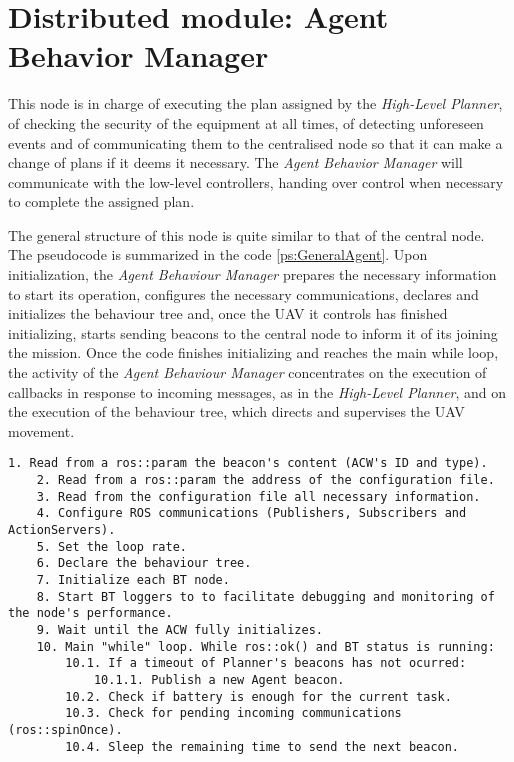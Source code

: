 \section{Distributed module: Agent Behavior Manager}
\label{sec:Distributed module: behavior manager}
This node is in charge of executing the plan assigned by the \emph{High-Level Planner}, of checking the security of the equipment at all times, of detecting unforeseen events and of communicating them to the centralised node so that it can make a change of plans if it deems it necessary. The \emph{Agent Behavior Manager} will communicate with the low-level controllers, handing over control when necessary to complete the assigned plan.

The general structure of this node is quite similar to that of the central node. The pseudocode is summarized in the code \ref{ps:GeneralAgent}. Upon initialization, the \emph{Agent Behaviour Manager} prepares the necessary information to start its operation, configures the necessary communications, declares and initializes the behaviour tree and, once the \gls{UAV} it controls has finished initializing, starts sending beacons to the central node to inform it of its joining the mission. Once the code finishes initializing and reaches the main while loop, the activity of the \emph{Agent Behaviour Manager} concentrates on the execution of callbacks in response to incoming messages, as in the \emph{High-Level Planner}, and on the execution of the behaviour tree, which directs and supervises the \gls{UAV} movement.

\begin{lstlisting}[caption={General operation of \emph{Agent Behaviour Manager}'s code}, breaklines=true, label=ps:GeneralAgent]
	1. Read from a ros::param the beacon's content (ACW's ID and type).
	2. Read from a ros::param the address of the configuration file.
	3. Read from the configuration file all necessary information.
	4. Configure ROS communications (Publishers, Subscribers and ActionServers).
	5. Set the loop rate.
	6. Declare the behaviour tree.
	7. Initialize each BT node.
	8. Start BT loggers to to facilitate debugging and monitoring of the node's performance.
	9. Wait until the ACW fully initializes.
	10. Main "while" loop. While ros::ok() and BT status is running:
		10.1. If a timeout of Planner's beacons has not ocurred:
			10.1.1. Publish a new Agent beacon.
		10.2. Check if battery is enough for the current task.
		10.3. Check for pending incoming communications (ros::spinOnce).
		10.4. Sleep the remaining time to send the next beacon.
\end{lstlisting}


